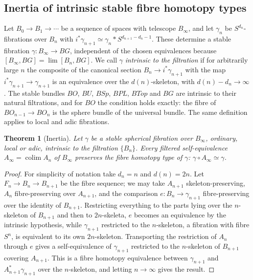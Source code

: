 \documentclass[11pt]{amsart}
\theoremstyle{plain}
\newtheorem{theorem}{Theorem}[section]
\theoremstyle{definition}
\numberwithin{equation}{section}
\DeclareMathOperator{\colim}{colim}
\begin{document}
\subsection{Inertia of intrinsic stable fibre homotopy types}
Let $B_0\to B_1\to\cdots$ be a sequence of spaces with telescope $B_\infty$, and let $\gamma_n$ be $S^{d_n}$-fibrations over $B_n$ with $i^*\gamma_{n+1}\simeq\gamma_n\ast S^{d_{n+1}-d_n-1}$.
These determine a stable fibration $\gamma\colon B_\infty\to BG$, independent of the chosen equivalences because $[B_\infty,BG]=\lim[B_n,BG]$.
We call $\gamma$ \emph{intrinsic to the filtration} if for arbitrarily large $n$ the composite of the canonical section $B_n\to i^*\gamma_{n+1}$ with the map $i^*\gamma_{n+1}\to\gamma_{n+1}$ is an equivalence over the $d(n)$-skeleton, with $d(n)-d_n\to\infty$.
The stable bundles $BO$, $BU$, $BSp$, $BPL$, $BTop$ and $BG$ are intrinsic to their natural filtrations, and for $BO$ the condition holds exactly: the fibre of $BO_{n-1}\to BO_n$ is the sphere bundle of the universal bundle.
The same definition applies to local and adic fibrations.

\begin{theorem}[Inertia]\label{thm:inertia}
Let $\gamma$ be a stable spherical fibration over $B_\infty$, ordinary, local or adic, intrinsic to the filtration $\{B_n\}$.
Every filtered self-equivalence $A_\infty=\colim A_n$ of $B_\infty$ preserves the fibre homotopy type of $\gamma$: $\gamma\circ A_\infty\simeq\gamma$.
\end{theorem}

\begin{proof}
For simplicity of notation take $d_n=n$ and $d(n)=2n$.
Let $F_n\to B_n\to B_{n+1}$ be the fibre sequence; we may take $A_{n+1}$ skeleton-preserving, $A_n$ fibre-preserving over $A_{n+1}$, and the comparison $e\colon B_n\to\gamma_{n+1}$ fibre-preserving over the identity of $B_{n+1}$.
Restricting everything to the parts lying over the $n$-skeleton of $B_{n+1}$ and then to $2n$-skeleta, $e$ becomes an equivalence by the intrinsic hypothesis, while $\gamma_{n+1}$ restricted to the $n$-skeleton, a fibration with fibre $S^n$, is equivalent to its own $2n$-skeleton.
Transporting the restriction of $A_n$ through $e$ gives a self-equivalence of $\gamma_{n+1}$ restricted to the $n$-skeleton of $B_{n+1}$ covering $A_{n+1}$.
This is a fibre homotopy equivalence between $\gamma_{n+1}$ and $A_{n+1}^*\gamma_{n+1}$ over the $n$-skeleton, and letting $n\to\infty$ gives the result.
\end{proof}
\end{document}
